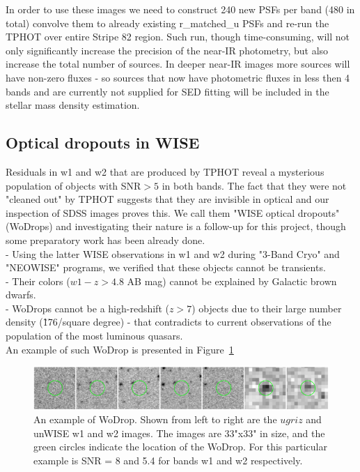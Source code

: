 In order to use these images we need to construct 240 new PSFs per band (480 in total) convolve them to already existing r\_matched\_u PSFs and re-run the TPHOT over entire Stripe 82 region. Such run, though time-consuming, will not only significantly increase the precision of the near-IR photometry, but also increase the total number of sources. In deeper near-IR images more sources will have non-zero fluxes - so sources that now have photometric fluxes in less then 4 bands and are currently not supplied for SED fitting will be included in the stellar mass density estimation. 

\subsection{Optical dropouts in WISE}
Residuals in w1 and w2 that are produced by TPHOT reveal a mysterious population of objects with SNR$>5$ in both bands. The fact that they were not "cleaned out" by TPHOT suggests that they are invisible in optical and our inspection of SDSS images proves this. We call them "WISE optical dropouts" (WoDrops) and investigating their nature is a follow-up for this project, though some preparatory work has been already done.\\
- Using the latter WISE observations in w1 and w2 during "3-Band Cryo" and "NEOWISE" programs, we verified that these objects cannot be transients.\\
- Their colors ($w1-z>4.8$ AB mag) cannot be explained by Galactic brown dwarfs.\\
- WoDrops cannot be a high-redshift ($z>7$) objects due to their large number density (\~176/square degree) - that contradicts to current observations of the population of the most luminous quasars.\\
An example of such WoDrop is presented in Figure~\ref{fig:wodrop_sdss}

\begin{figure}[!ht]
\includegraphics[width=6in]{Figures/wodrop_sdss_w1w2.png}
\caption{An example of WoDrop. Shown from left to right are the $ugriz$ and unWISE w1 and w2 images. The images are 33"x33" in size, and the green circles indicate the location of the WoDrop. For this particular example is SNR = 8 and 5.4 for bands w1 and w2 respectively.}
\label{fig:wodrop_sdss}
\end{figure}

